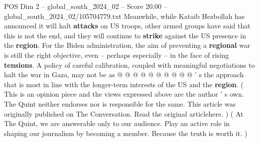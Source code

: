 \begin{textsample}{POS Dim 2 – global\_south\_2024\_02 – Score 20.00 – global\_south\_2024\_02/105704779.txt}
Meanwhile, while Kataib Hezbollah has announced it will halt \textbf{attacks} on US troops, other armed groups have said that this is not the end, and they will continue to \textbf{strike} against the US presence in the \textbf{region}.
For the Biden administration, the aim of preventing a \textbf{regional} war is still the right objective, even -- perhaps especially -- in the face of rising \textbf{tensions}.
A policy of careful calibration, coupled with meaningful negotiations to halt the war in Gaza, may not be as @ @ @ @ @ @ @ @ @ @ ' s the approach that is most in line with the longer-term interests of the US and the \textbf{region}. ( This is an opinion piece and the views expressed above are the author ' s own.
The Quint neither endorses nor is responsible for the same.
This article was originally published on The Conversation.
Read the original articlehere. ) ( At The Quint, we are answerable only to our audience.
Play an active role in shaping our journalism by becoming a member.
Because the truth is worth it. )

\end{textsample}
